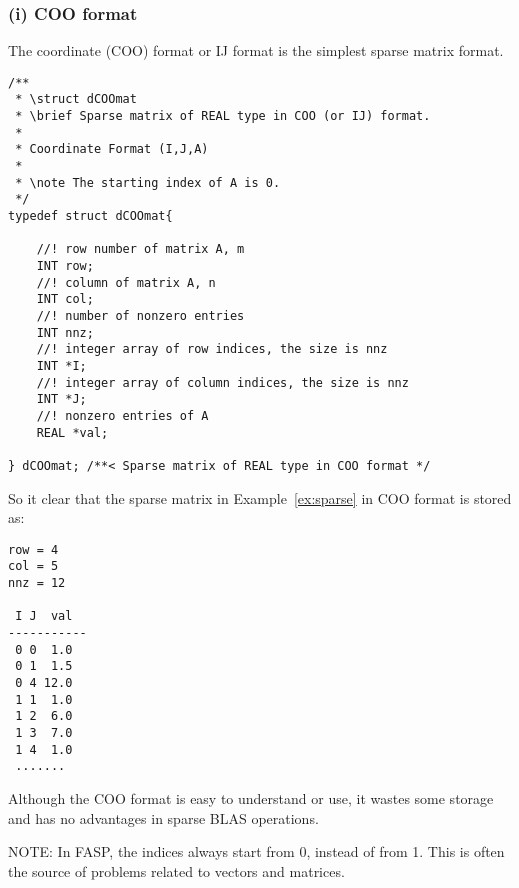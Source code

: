 \documentclass[11pt]{memoir}
\begin{document}
\subsubsection*{(i) COO format}

The coordinate (COO) format or IJ format is the simplest sparse matrix format. 
\begin{lstlisting}
/** 
 * \struct dCOOmat
 * \brief Sparse matrix of REAL type in COO (or IJ) format.
 *
 * Coordinate Format (I,J,A)
 *
 * \note The starting index of A is 0.
 */
typedef struct dCOOmat{
	
	//! row number of matrix A, m
	INT row;   
	//! column of matrix A, n
	INT col;   
	//! number of nonzero entries
	INT nnz;
	//! integer array of row indices, the size is nnz
	INT *I;   
	//! integer array of column indices, the size is nnz
	INT *J;    
	//! nonzero entries of A
	REAL *val;
	
} dCOOmat; /**< Sparse matrix of REAL type in COO format */
\end{lstlisting}
%
So it clear that the sparse matrix in Example~\ref{ex:sparse} in COO format is stored as:
%
\begin{lstlisting}[numbers=none]
row = 4
col = 5
nnz = 12

 I J  val 
-----------
 0 0  1.0
 0 1  1.5
 0 4 12.0
 1 1  1.0
 1 2  6.0
 1 3  7.0
 1 4  1.0
 .......
\end{lstlisting}
%
Although the COO format is easy to understand or use, it wastes some storage and has no advantages in sparse BLAS operations.

\begin{snugshade}\noindent
NOTE: In FASP, the indices always start from 0, instead of from 1. This is often the source of problems related to vectors and matrices. 
\end{snugshade}
\end{document}

